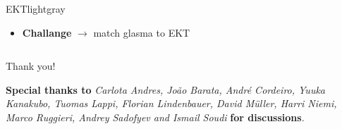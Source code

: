 \documentclass[aspectratio=169,11pt,usenames,dvipsnames]{beamer}
\begin{document}
\begin{frame}
\begin{center}
\begin{columns}
\begin{center}
\begin{custombox2}{{\color{palblue}\large EKT}}{lightgray}
\begin{varwidth}{0.88\textwidth}
\begin{itemize}
                        \item {\bfseries\color{jyured}Challange} $\rightarrow$ match glasma to EKT
                    \end{itemize}
                    \end{varwidth}
                \end{custombox2}
            \end{center}
        \end{columns}
    \end{center}
\end{frame}

\begin{frame}{}
    \vspace{85pt}
    \begin{center}
    \color{white}
    {\huge\centering Thank you!} \\[80pt]
    \begin{varwidth}{0.8\textwidth}
        \begin{center}
            {\scriptsize \textbf{Special thanks to} \textit{Carlota Andres, João Barata, André Cordeiro, Yuuka Kanakubo, Tuomas Lappi, Florian Lindenbauer, David M\"{u}ller, Harri Niemi, Marco Ruggieri, Andrey Sadofyev and Ismail Soudi} \textbf{for discussions}.}
        \end{center}
    \end{varwidth}
    \end{center}
\end{frame}
\usebackgroundtemplate{ } 
\end{document}
